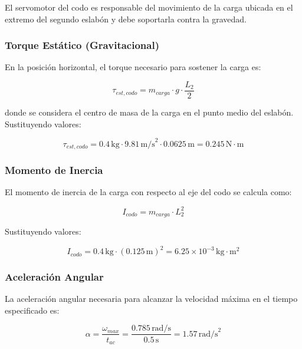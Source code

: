 El servomotor del codo es responsable del movimiento de la carga ubicada en el extremo del segundo eslabón y debe soportarla contra la gravedad.

\subsubsection{Torque Estático (Gravitacional)}

En la posición horizontal, el torque necesario para sostener la carga es:

\begin{equation}
\tau_{est,codo} = m_{carga} \cdot g \cdot \frac{L_2}{2}
\end{equation}

donde se considera el centro de masa de la carga en el punto medio del eslabón. Sustituyendo valores:

\begin{equation}
\tau_{est,codo} = 0.4 \, \text{kg} \cdot 9.81 \, \text{m/s}^2 \cdot 0.0625 \, \text{m} = 0.245 \, \text{N} \cdot \text{m}
\end{equation}

\subsubsection{Momento de Inercia}

El momento de inercia de la carga con respecto al eje del codo se calcula como:

\begin{equation}
I_{codo} = m_{carga} \cdot L_2^2
\end{equation}

Sustituyendo valores:

\begin{equation}
I_{codo} = 0.4 \, \text{kg} \cdot (0.125 \, \text{m})^2 = 6.25 \times 10^{-3} \, \text{kg} \cdot \text{m}^2
\end{equation}

\subsubsection{Aceleración Angular}

La aceleración angular necesaria para alcanzar la velocidad máxima en el tiempo especificado es:

\begin{equation}
\alpha = \frac{\omega_{max}}{t_{ac}} = \frac{0.785 \, \text{rad/s}}{0.5 \, \text{s}} = 1.57 \, \text{rad/s}^2
\end{equation}

